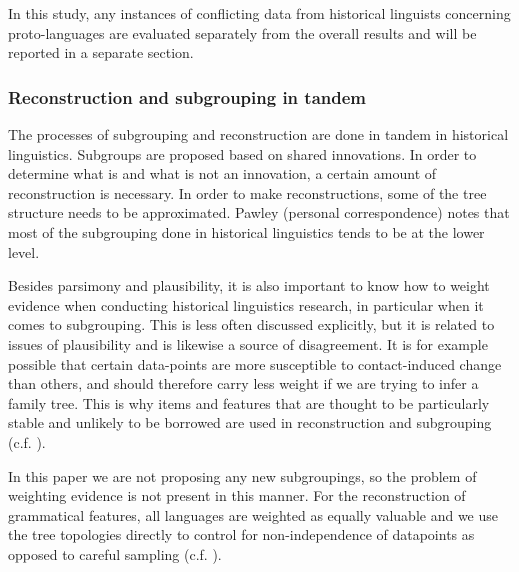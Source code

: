 \documentclass[a4paper,10pt]{article} %
\begin{document}
In this study, any instances of conflicting data from historical linguists concerning proto-languages are evaluated separately from the overall results and will be reported in a separate section. 


\subsubsection{Reconstruction and subgrouping in tandem}
The processes of subgrouping and reconstruction are done in tandem in historical linguistics. Subgroups are proposed based on shared innovations. In order to determine what is and what is not an innovation, a certain amount of reconstruction is necessary. In order to make reconstructions, some of the tree structure needs to be approximated. Pawley (personal correspondence) notes that most of the subgrouping done in historical linguistics tends to be at the lower level. 

Besides parsimony and plausibility, it is also important to know how to weight evidence when conducting historical linguistics research, in particular when it comes to subgrouping. This is less often discussed explicitly, but it is related to issues of plausibility and is likewise a source of disagreement. It is for example possible that certain data-points are more susceptible to contact-induced change than others, and should therefore carry less weight if we are trying to infer a family tree. This is why items and features that are thought to be particularly stable and unlikely to be borrowed are used in reconstruction and subgrouping (c.f. \citet{pawley_2009_solomons}).

In this paper we are not proposing any new subgroupings, so the problem of weighting evidence is not present in this manner. For the reconstruction of grammatical features, all languages are weighted as equally valuable and we use the tree topologies directly to control for non-independence of datapoints as opposed to careful sampling (c.f. \cite{ross2004morphosyntactic}).
\end{document}
